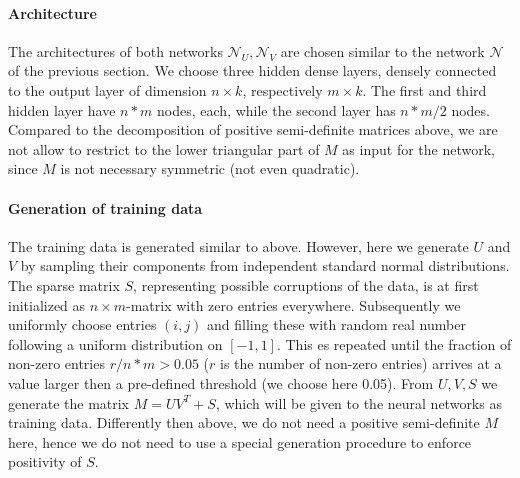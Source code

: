 \paragraph{Architecture}
The architectures of both networks $\mathcal{N}_U,\mathcal{N}_V$ are chosen similar to the network $\mathcal{N}$ of the previous section. We choose three hidden dense layers, densely connected to the output layer of dimension $n\times k$, respectively $m\times k$. The first and third hidden layer have $n*m$ nodes, each, while the second layer has $n*m/2$ nodes. Compared to the decomposition of positive semi-definite matrices above, we are not allow to restrict to the lower triangular part of $M$ as input for the network, since $M$ is not necessary symmetric (not even quadratic).


\paragraph{Generation of training data}

The training data is generated similar to above. However, here we generate $U$ and $V$ by sampling their components from independent standard normal distributions. The sparse matrix $S$, representing possible corruptions of the data, is at first initialized as $n\times m$-matrix with zero entries everywhere. Subsequently we uniformly choose entries $(i,j)$ and filling these with random real number following a uniform distribution on $[-1,1]$. This es repeated until the fraction of non-zero entries $r/n*m >0.05$ ($r$ is the number of non-zero entries) arrives at a value larger then a pre-defined threshold (we choose here 0.05). From $U,V,S$ we generate the matrix $M = UV^T + S$, which will be given to the neural networks as training data. Differently then above, we do not need a positive semi-definite $M$ here, hence we do not need to use a special generation procedure to enforce positivity of $S$.

